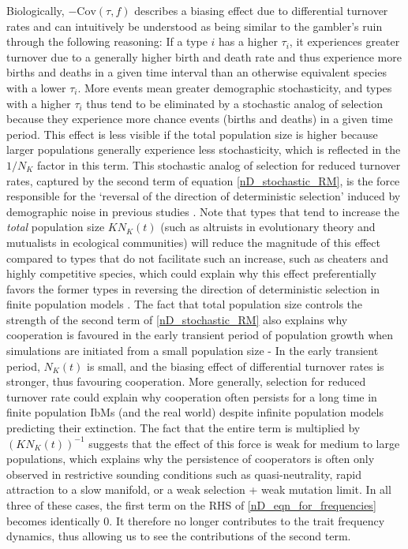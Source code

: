 Biologically, $-\textrm{Cov}(\tau,f)$ describes a biasing effect due to differential turnover rates and can intuitively be understood as being similar to the gambler's ruin through the following reasoning: If a type $i$ has a higher $\tau_i$, it experiences greater turnover due to a generally higher birth and death rate and thus experience more births and deaths in a given time interval than an otherwise equivalent species with a lower $\tau_i$. More events mean greater demographic stochasticity, and types with a higher $\tau_i$ thus tend to be eliminated by a stochastic analog of selection because they experience more chance events (births and deaths) in a given time period. This effect is less visible if the total population size is higher because larger populations generally experience less stochasticity, which is reflected in the $1/N_K$ factor in this term. This stochastic analog of selection for reduced turnover rates, captured by the second term of equation \eqref{nD_stochastic_RM}, is the force responsible for the `reversal of the direction of deterministic selection' induced by demographic noise in previous studies \citep{houchmandzadeh_selection_2012, houchmandzadeh_fluctuation_2015, constable_demographic_2016, mcleod_social_2019}. Note that types that tend to increase the \emph{total} population size $KN_K(t)$ (such as altruists in evolutionary theory and mutualists in ecological communities) will reduce the magnitude of this effect compared to types that do not facilitate such an increase, such as cheaters and highly competitive species, which could explain why this effect preferentially favors the former types in reversing the direction of deterministic selection in finite population models \citep{houchmandzadeh_fluctuation_2015, mcleod_social_2019}. The fact that total population size controls the strength of the second term of \eqref{nD_stochastic_RM} also explains why cooperation is favoured in the early transient period of population growth \citep{melbinger_evolutionary_2010} when simulations are initiated from a small population size - In the early transient period, $N_K(t)$ is small, and the biasing effect of differential turnover rates is stronger, thus favouring cooperation. More generally, selection for reduced turnover rate could explain why cooperation often persists for a long time in finite population IbMs (and the real world) despite infinite population models predicting their extinction. The fact that the entire term is multiplied by $(KN_K(t))^{-1}$ suggests that the effect of this force is weak for medium to large populations, which explains why the persistence of cooperators is often only observed in restrictive sounding conditions such as quasi-neutrality, rapid attraction to a slow manifold, or a weak selection + weak mutation limit. In all three of these cases, the first term on the RHS of \eqref{nD_eqn_for_frequencies} becomes identically 0. It therefore no longer contributes to the trait frequency dynamics, thus allowing us to see the contributions of the second term.\\
